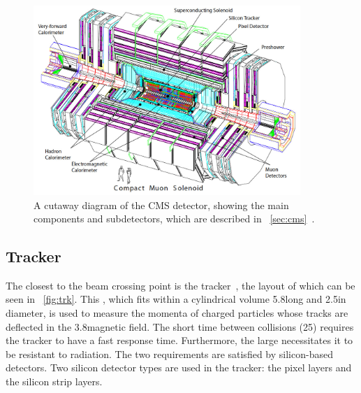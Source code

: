 \begin{figure}[h]
\centering
\includegraphics[width=0.9\textwidth]{detectorFigures/cms-perspective.png}
\caption{A cutaway diagram of the CMS detector, showing the main components and subdetectors, which are described in \Sec~\ref{sec:cms}~\cite{CMSTDR}.}
\label{fig:cms-exploded}
\end{figure}

\subsection{Tracker}
\label{sec:cms:tracker}

The closest \subdetector to the beam crossing point is the tracker~\cite{CMSTrackerTDR}, the layout of which can be seen in \Fig~\ref{fig:trk}. This \subdetector, which fits within a cylindrical volume 5.8\m long and 2.5\m in diameter, is used to measure the momenta of charged particles whose tracks are deflected in the 3.8\T magnetic field. 
The short time between collisions (25\ns) requires the tracker to have a fast response time. Furthermore, the large \pp \crosssection necessitates it to be resistant to radiation. The two requirements are satisfied by silicon-based detectors. Two silicon detector types are used in the \CMS tracker: the pixel layers and the silicon strip layers.




